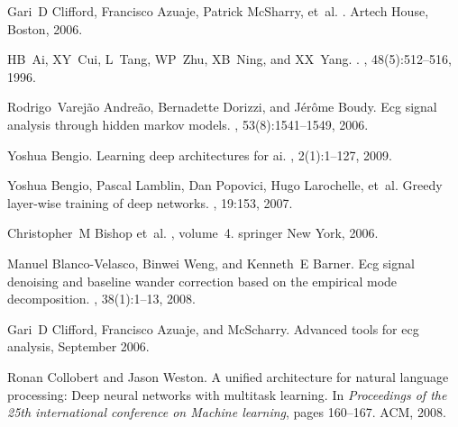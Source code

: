 %
%
% 
% 
%

\begin{thebibliography}{99.}%

Gari~D Clifford, Francisco Azuaje, Patrick McSharry, et~al.
.
\newblock Artech House, Boston, 2006.

HB~Ai, XY~Cui, L~Tang, WP~Zhu, XB~Ning, and XX~Yang.
.
, 48(5):512--516,
  1996.

Rodrigo~Varej{\~a}o Andre{\~a}o, Bernadette Dorizzi, and J{\'e}r{\^o}me Boudy.
\newblock Ecg signal analysis through hidden markov models.
, 53(8):1541--1549,
  2006.

Yoshua Bengio.
\newblock Learning deep architectures for ai.
,
  2(1):1--127, 2009.

Yoshua Bengio, Pascal Lamblin, Dan Popovici, Hugo Larochelle, et~al.
\newblock Greedy layer-wise training of deep networks.
, 19:153,
  2007.

Christopher~M Bishop et~al.
, volume~4.
\newblock springer New York, 2006.

Manuel Blanco-Velasco, Binwei Weng, and Kenneth~E Barner.
\newblock Ecg signal denoising and baseline wander correction based on the
  empirical mode decomposition.
, 38(1):1--13, 2008.

Gari~D Clifford, Francisco Azuaje, and McScharry.
\newblock Advanced tools for ecg analysis, September 2006.

Ronan Collobert and Jason Weston.
\newblock A unified architecture for natural language processing: Deep neural
  networks with multitask learning.
\newblock In {\em Proceedings of the 25th international conference on Machine
  learning}, pages 160--167. ACM, 2008.


\end{thebibliography}
